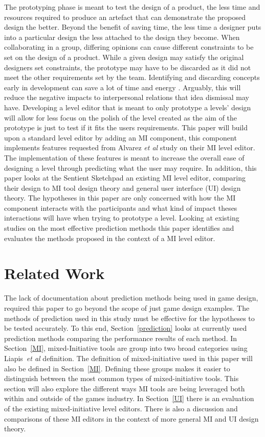 \documentclass[journal]{IEEEtran}
\begin{document}
The prototyping phase is meant to test the design of a product, the less time and resources required to produce an artefact that can demonstrate the proposed design the better. Beyond the benefit of saving time, the less time a designer puts into a particular design the less attached to the design they become. When collaborating in a group, differing opinions can cause different constraints to be set on the design of a product. While a given design may satisfy the original designers set constraints, the prototype may have to be discarded as it did not meet the other requirements set by the team. Identifying and discarding concepts early in development can save a lot of time and energy \cite[p.489]{stempfle1999thinking}. Arguably, this will reduce the negative impacts to interpersonal relations that idea dismissal may have. Developing a level editor that is meant to only prototype a levels' design will allow for less focus on the polish of the level created as the aim of the prototype is just to test if it fits the users requirements. This paper will build upon a standard level editor by adding an MI component, this component implements features requested from Alvarez \textit{et al}\cite{alvarez2018fostering} study on their MI level editor. The implementation of these features is meant to increase the overall ease of designing a level through predicting what the user may require. In addition, this paper looks at the Sentient Sketchpad\cite{liapis2013sentient} an existing MI level editor, comparing their design to MI tool design theory and general user interface (UI) design theory. The hypotheses in this paper are only concerned with how the MI component interacts with the participants and what kind of impact theses interactions will have when trying to prototype a level. Looking at existing studies on the most effective prediction methods \cite{shepperd2001comparing,mendes2002further, wen2012systematic} this paper identifies and evaluates the methods proposed in the context of a MI level editor.  

\section{Related Work}
The lack of documentation about prediction methods being used in game design, required this paper to go  beyond the scope of just game design examples. The methods of prediction used in this study must be effective for the hypotheses to be tested accurately. To this end, Section~\ref{prediction} looks at currently used prediction methods comparing the performance results of each method. In Section~\ref{MI}, mixed-Initiative tools are group into two broad categories using Liapis~\textit{et al}\cite{liapis2016mixed} definition. The definition of mixed-initiative used in this paper will also be defined in Section~\ref{MI}. Defining these groups makes it easier to distinguish between the most common types of mixed-initiative tools. This section will also explore the different ways MI tools are being leveraged both within and outside of the games industry. In Section~\ref{UI} there is an evaluation of the existing mixed-initiative level editors. There is also a discussion and comparisons of these MI editors in the context of more general MI and UI design theory.  
\end{document}
